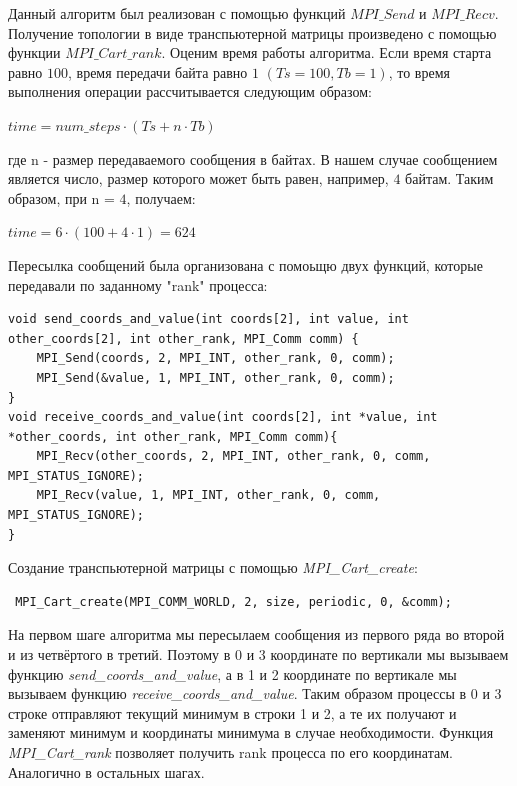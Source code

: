 \documentclass[a4paper]{article}
\begin{document}
Данный алгоритм был реализован с помощью функций $MPI\_Send$ и $MPI\_Recv$. Получение топологии в виде транспьютерной матрицы произведено с помощью функции
$MPI\_Cart\_rank$.
Оценим время работы алгоритма. Если время старта равно $100$, время передачи байта равно $1$ $(Ts=100,Tb=1)$, то время выполнения операции рассчитывается следующим
образом:
\begin{center}
$time = num\_steps · (T s + n · T b)$
\end{center}

где n - размер передаваемого сообщения в байтах. В нашем случае сообщением является
число, размер которого может быть равен, например, $4$ байтам.
Таким образом, при n = $4$, получаем:
\begin{center}
$time = 6 · (100 + 4 · 1) = 624$
\end{center}
\newpage
Пересылка сообщений была организована с помоьщю двух функций, которые передавали по заданному "rank" процесса: 
\begin{lstlisting}
void send_coords_and_value(int coords[2], int value, int other_coords[2], int other_rank, MPI_Comm comm) {
    MPI_Send(coords, 2, MPI_INT, other_rank, 0, comm);
    MPI_Send(&value, 1, MPI_INT, other_rank, 0, comm);
}
void receive_coords_and_value(int coords[2], int *value, int *other_coords, int other_rank, MPI_Comm comm){
    MPI_Recv(other_coords, 2, MPI_INT, other_rank, 0, comm, MPI_STATUS_IGNORE);
    MPI_Recv(value, 1, MPI_INT, other_rank, 0, comm, MPI_STATUS_IGNORE);
}
\end{lstlisting}

Создание транспьютерной матрицы с помощью \textit{MPI\_Cart\_create}:
\begin{lstlisting}
 MPI_Cart_create(MPI_COMM_WORLD, 2, size, periodic, 0, &comm);
\end{lstlisting}

На первом шаге алгоритма мы пересылаем сообщения из первого ряда во второй и из четвёртого в третий. Поэтому в 0 и 3 координате по вертикали мы вызываем функцию \textit{send\_coords\_and\_value}, а в 1 и 2 координате по вертикале мы вызываем функцию \textit{receive\_coords\_and\_value}. Таким образом процессы в 0 и 3 строке отправляют текущий минимум в строки 1 и 2, а те их получают и заменяют минимум и координаты минимума в случае необходимости. Функция \textit{MPI\_Cart\_rank} позволяет получить rank процесса по его координатам. Аналогично в остальных шагах.
\end{document}
